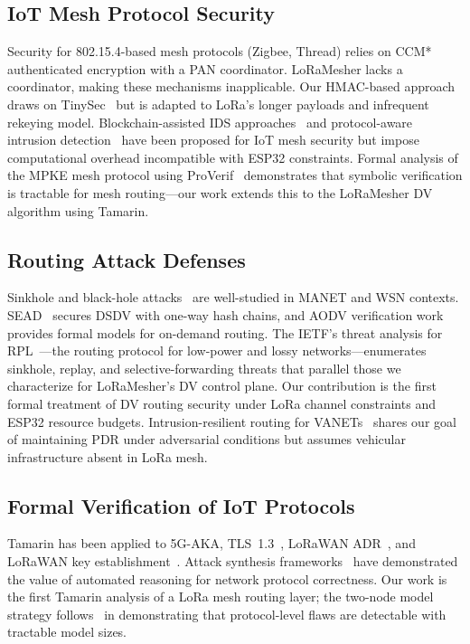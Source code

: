 \documentclass[10pt,journal,compsoc]{IEEEtran}
\begin{document}
\subsection{IoT Mesh Protocol Security}

Security for 802.15.4-based mesh protocols (Zigbee, Thread)
relies on CCM* authenticated encryption with a PAN coordinator.
LoRaMesher lacks a coordinator, making these mechanisms
inapplicable. Our HMAC-based approach draws on TinySec~\cite{shelby2026-zero-trust-iot}
but is adapted to LoRa's longer payloads and infrequent rekeying
model. Blockchain-assisted IDS approaches~\cite{springer2026-blockchain-ids}
and protocol-aware intrusion detection~\cite{bringye2026-lorawan-ids,ieee2025-lorawan-jamming-ids}
have been proposed for IoT mesh security but impose
computational overhead incompatible with ESP32 constraints.
Formal analysis of the MPKE mesh protocol using
ProVerif~\cite{ieee2025-mpke-proverif} demonstrates that
symbolic verification is tractable for mesh routing—our work
extends this to the LoRaMesher DV algorithm using Tamarin.

\subsection{Routing Attack Defenses}

Sinkhole and black-hole attacks~\cite{sejaphala2025-sinkhole-detection,
ieee2025-blackhole-optimization,zenodo2025-manet-routing-attacks}
are well-studied in MANET and WSN contexts.
SEAD~\cite{hu2002-sead} secures DSDV with one-way hash chains,
and AODV verification work~\cite{glabbeek2016-aodv-verification}
provides formal models for on-demand routing.
The IETF's threat analysis for RPL~\cite{ietf-rfc7416}—the routing
protocol for low-power and lossy networks—enumerates sinkhole,
replay, and selective-forwarding threats that parallel those we
characterize for LoRaMesher's DV control plane.
Our contribution is the first formal treatment of DV routing
security under LoRa channel constraints and ESP32 resource budgets.
Intrusion-resilient routing for VANETs~\cite{springer2026-vanet-routing}
shares our goal of maintaining PDR under adversarial conditions
but assumes vehicular infrastructure absent in LoRa mesh.

\subsection{Formal Verification of IoT Protocols}

Tamarin has been applied to 5G-AKA, TLS~1.3~\cite{basin2025-tamarin-book},
LoRaWAN ADR~\cite{ieee2025-adr-eventb}, and LoRaWAN
key establishment~\cite{ieee2025-lorawan-key-verification}.
Attack synthesis frameworks~\cite{vonhippel2024-verification-attack,pereira2025-router-verification}
have demonstrated the value of automated reasoning for
network protocol correctness.
Our work is the first Tamarin analysis of a LoRa mesh routing
layer; the two-node model strategy follows~\cite{ieee2025-kang-tamarin,
zenodo2025-formal-methods-comparison} in demonstrating that
protocol-level flaws are detectable with tractable model sizes.
\end{document}
